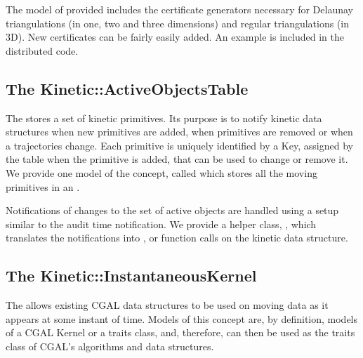 The model of  provided includes the certificate
generators necessary for Delaunay triangulations (in one, two and
three dimensions) and regular triangulations (in 3D).  New
certificates can be fairly easily added. An example is included in the
distributed code.



\subsection{The Kinetic::ActiveObjectsTable\label{sec:kds_active_objects_table}}


The  stores a set of kinetic primitives.
Its purpose is to notify kinetic data structures when new primitives
are added, when primitives are removed or when a trajectories change.
Each primitive is uniquely identified by a Key, assigned by
the table when the primitive is added, that can be used to change or
remove it.  We provide one model of the
 concept, called
 which stores all the moving
primitives in an .

Notifications of changes to the set of active objects are handled
using a setup similar to the  audit time
notification. We provide a helper class,
, which translates the notifications into ,
 or  function calls on the kinetic data
structure.



\subsection{The Kinetic::InstantaneousKernel\label{sec:kds_instantaneous_kernel}}


The  allows existing CGAL data structures
to be used on moving data as it appears at some instant of time.
Models of this concept are, by definition, models of a CGAL
Kernel or a traits class, and, therefore, can then be used as
the traits class of CGAL's algorithms and data structures.

